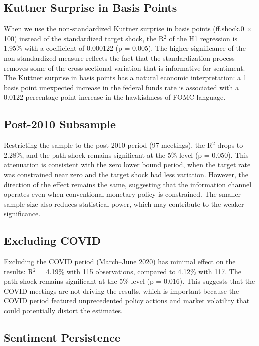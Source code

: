 \documentclass[12pt]{article}
\begin{document}
\subsection{Kuttner Surprise in Basis Points}

When we use the non-standardized Kuttner surprise in basis points (ff.shock.0 × 100) instead of the standardized target shock, the R$^2$ of the H1 regression is 1.95\% with a coefficient of 0.000122 (p = 0.005). The higher significance of the non-standardized measure reflects the fact that the standardization process removes some of the cross-sectional variation that is informative for sentiment. The Kuttner surprise in basis points has a natural economic interpretation: a 1 basis point unexpected increase in the federal funds rate is associated with a 0.0122 percentage point increase in the hawkishness of FOMC language.

\subsection{Post-2010 Subsample}

Restricting the sample to the post-2010 period (97 meetings), the R$^2$ drops to 2.28\%, and the path shock remains significant at the 5\% level (p = 0.050). This attenuation is consistent with the zero lower bound period, when the target rate was constrained near zero and the target shock had less variation. However, the direction of the effect remains the same, suggesting that the information channel operates even when conventional monetary policy is constrained. The smaller sample size also reduces statistical power, which may contribute to the weaker significance.

\subsection{Excluding COVID}

Excluding the COVID period (March--June 2020) has minimal effect on the results: R$^2$ = 4.19\% with 115 observations, compared to 4.12\% with 117. The path shock remains significant at the 5\% level (p = 0.016). This suggests that the COVID meetings are not driving the results, which is important because the COVID period featured unprecedented policy actions and market volatility that could potentially distort the estimates.

\subsection{Sentiment Persistence}
\end{document}
